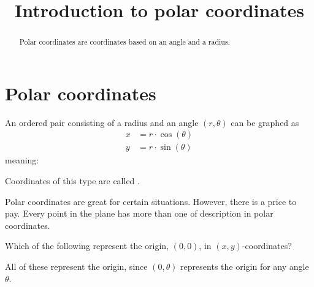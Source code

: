 \documentclass{ximera}
\title[Dig-In:]{Introduction to polar coordinates}
\begin{document}
\begin{abstract}
Polar coordinates are coordinates based on an angle and a radius.
\end{abstract}
\maketitle

\section{Polar coordinates}


\begin{definition}
  An ordered pair consisting of a radius and an angle $(r,\theta)$
  can be graphed as
  \begin{align*}
    x &= r\cdot \cos(\theta)\\
    y &= r\cdot \sin(\theta)
  \end{align*}
  meaning:
  \begin{image}[2in]
  \end{image}
  Coordinates of this type are called .
\end{definition}

Polar coordinates are great for certain situations. However, there is
a price to pay. Every point in the plane has more than one of
description in polar coordinates.

\begin{question}
  Which of the following represent the origin, $(0,0)$, in
  $(x,y)$-coordinates?
  \begin{selectAll}
  \end{selectAll}
  \begin{feedback}
    All of these represent the origin, since $(0,\theta)$ represents
    the origin for any angle $\theta$.
  \end{feedback}
\end{question}
\end{document}
